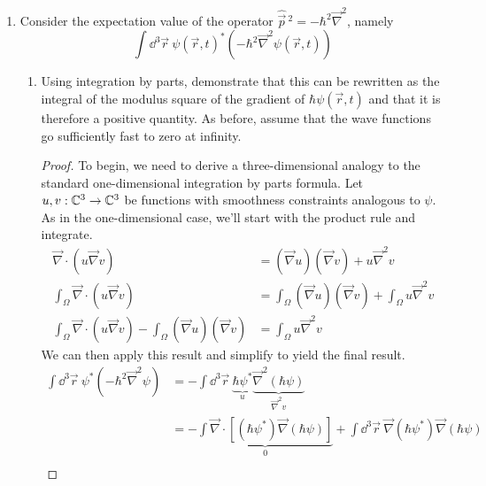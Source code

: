 \documentclass[../psets.tex]{subfiles}
\begin{document}
\begin{enumerate}
\begin{enumerate}
\begin{proof}
            Additionally, note that if you take the limit as $V\to\C^3$, both terms go to zero (because probability density is conserved within the entire space). Since the sum of two terms equal to zero is zero, this is another way of verifying the equality in the continuity equation.
        \end{proof}
    \end{enumerate}
    \item Consider the expectation value of the operator $\hat{\vec{p}}{\,}^2=-\hbar^2\vec{\nabla}^2$, namely
    \begin{equation*}
        \int\dd^3\vec{r}\ \psi(\vec{r},t)^*\left( -\hbar^2\vec{\nabla}^2\psi(\vec{r},t) \right)
    \end{equation*}
    \begin{enumerate}
        \item Using integration by parts, demonstrate that this can be rewritten as the integral of the modulus square of the gradient of $\hbar\psi(\vec{r},t)$ and that it is therefore a positive quantity. As before, assume that the wave functions go sufficiently fast to zero at infinity.
        \begin{proof}
            To begin, we need to derive a three-dimensional analogy to the standard one-dimensional integration by parts formula. Let $u,v:\mathbb{C}^3\to\mathbb{C}^3$ be functions with smoothness constraints analogous to $\psi$. As in the one-dimensional case, we'll start with the product rule and integrate.
            \begin{align*}
                \vec{\nabla}\cdot(u\vec{\nabla}v) &= (\vec{\nabla}u)(\vec{\nabla}v)+u\vec{\nabla}^2v\\
                \int_\Omega\vec{\nabla}\cdot(u\vec{\nabla}v) &= \int_\Omega(\vec{\nabla}u)(\vec{\nabla}v)+\int_\Omega u\vec{\nabla}^2v\\
                \int_\Omega\vec{\nabla}\cdot(u\vec{\nabla}v)-\int_\Omega(\vec{\nabla}u)(\vec{\nabla}v) &= \int_\Omega u\vec{\nabla}^2v
            \end{align*}
            We can then apply this result and simplify to yield the final result.
            \begin{align*}
                \int\dd^3\vec{r}\ \psi^*\left( -\hbar^2\vec{\nabla}^2\psi \right) &= -\int\dd^3\vec{r}\ \underbrace{\hbar\psi^*}_u\underbrace{\vec{\nabla}^2(\hbar\psi)}_{\vec{\nabla}^2v}\\
                &= -\underbrace{\int\vec{\nabla}\cdot\left[ (\hbar\psi^*)\vec{\nabla}(\hbar\psi) \right]}_0+\int\dd^3\vec{r}\ \vec{\nabla}(\hbar\psi^*)\vec{\nabla}(\hbar\psi)\\

\end{align*}
\end{proof}
\end{enumerate}
\end{enumerate}
\end{document}
